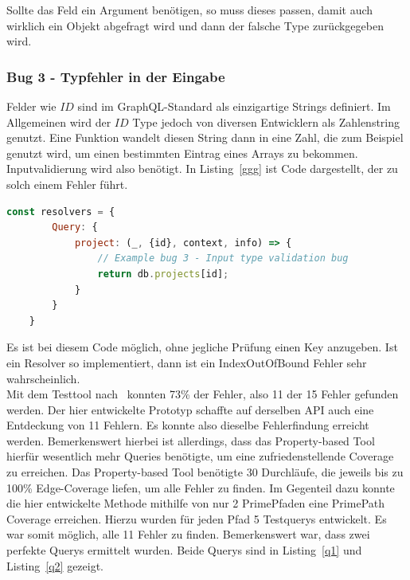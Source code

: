 Sollte das Feld ein Argument benötigen, so muss dieses passen, damit auch wirklich ein Objekt abgefragt wird und dann der falsche Type zurückgegeben wird.

\subsubsection{Bug 3 - Typfehler in der Eingabe}

Felder wie $ID$ sind im GraphQL-Standard als einzigartige Strings definiert.
Im Allgemeinen wird der $ID$ Type jedoch von diversen Entwicklern als Zahlenstring genutzt.
Eine Funktion wandelt diesen String dann in eine Zahl, die zum Beispiel genutzt wird, um einen bestimmten Eintrag eines Arrays zu bekommen.
Inputvalidierung wird also benötigt.
In Listing~\ref{ggg} ist Code dargestellt, der zu solch einem Fehler führt.

\begin{lstlisting}[language=javascript, caption={Code ohne Inputvalidierung}, label={ggg}]
    const resolvers = {
        Query: {
            project: (_, {id}, context, info) => {
                // Example bug 3 - Input type validation bug
                return db.projects[id];
            }
        }
    }
\end{lstlisting}

Es ist bei diesem Code möglich, ohne jegliche Prüfung einen Key anzugeben.
Ist ein Resolver so implementiert, dann ist ein IndexOutOfBound Fehler sehr wahrscheinlich.
\\


Mit dem Testtool nach~\cite[Property-based Testing]{property-based-testing} konnten 73\% der Fehler, also 11 der 15 Fehler gefunden  werden.
Der hier entwickelte Prototyp schaffte auf derselben API auch eine Entdeckung von 11 Fehlern.
Es konnte also dieselbe Fehlerfindung erreicht werden.
Bemerkenswert hierbei ist allerdings, dass das Property-based Tool hierfür wesentlich mehr Queries benötigte, um eine zufriedenstellende Coverage zu erreichen.
Das Property-based Tool benötigte 30 Durchläufe, die jeweils bis zu 100\% Edge-Coverage liefen, um alle Fehler zu finden.
Im Gegenteil dazu konnte die hier entwickelte Methode mithilfe von nur 2 PrimePfaden eine PrimePath Coverage erreichen.
Hierzu wurden für jeden Pfad 5 Testquerys entwickelt.
Es war somit möglich, alle 11 Fehler zu finden.
Bemerkenswert war, dass zwei perfekte Querys ermittelt wurden.
Beide Querys sind in Listing~\ref{q1} und Listing~\ref{q2} gezeigt. \\

